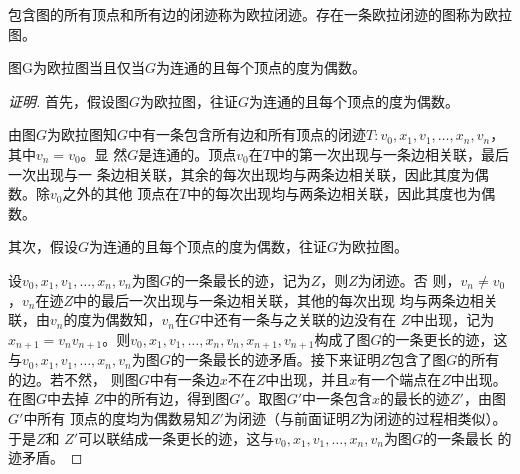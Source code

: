   \begin{Def}
    包含图的所有顶点和所有边的闭迹称为欧拉闭迹。存在一条欧拉闭迹的图称为欧拉图。
  \end{Def}
  \begin{Thm}
    图G为欧拉图当且仅当$G$为连通的且每个顶点的度为偶数。
  \end{Thm}
  \begin{proof}[证明]
      首先，假设图$G$为欧拉图，往证$G$为连通的且每个顶点的度为偶数。

  由图$G$为欧拉图知$G$中有一条包含所有边和所有顶点的闭迹$T:v_0,x_1,v_1,\ldots,
  x_n,v_n$，其中$v_n=v_0$。显
  然$G$是连通的。顶点$v_0$在$T$中的第一次出现与一条边相关联，最后一次出现与一
  条边相关联，其余的每次出现均与两条边相关联，因此其度为偶数。除$v_0$之外的其他
  顶点在$T$中的每次出现均与两条边相关联，因此其度也为偶数。

  其次，假设$G$为连通的且每个顶点的度为偶数，往证$G$为欧拉图。

  设$v_0,x_1,v_1,\ldots, x_n,v_n$为图$G$的一条最长的迹，记为$Z$，则$Z$为闭迹。否
  则，$v_n \neq v_0$，$v_n$在迹$Z$中的最后一次出现与一条边相关联，其他的每次出现
  均与两条边相关联，由$v_n$的度为偶数知，$v_n$在$G$中还有一条与之关联的边没有在
  $Z$中出现，记为$x_{n+1}=v_nv_{n+1}$。则$v_0,x_1,v_1,\ldots,
  x_n,v_n,x_{n+1},v_{n+1}$构成了图$G$的一条更长的迹，这与$v_0,x_1,v_1,\ldots,
  x_n,v_n$为图$G$的一条最长的迹矛盾。接下来证明$Z$包含了图$G$的所有的边。若不然，
  则图$G$中有一条边$x$不在$Z$中出现，并且$x$有一个端点在$Z$中出现。在图$G$中去掉
  $Z$中的所有边，得到图$G'$。取图$G'$中一条包含$x$的最长的迹$Z'$，由图$G'$中所有
  顶点的度均为偶数易知$Z'$为闭迹（与前面证明$Z$为闭迹的过程相类似）。于是$Z$和
  $Z'$可以联结成一条更长的迹，这与$v_0,x_1,v_1,\ldots, x_n,v_n$为图$G$的一条最长
  的迹矛盾。
  \end{proof}

